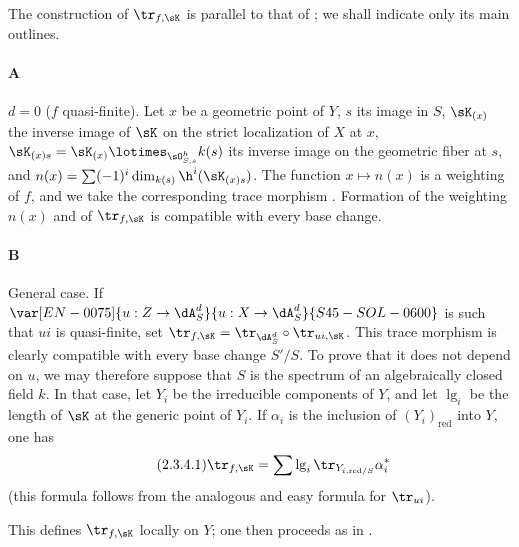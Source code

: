 \subsubsection{}\label{IV:2-3-4}

The construction of $\tr_{f,\sK}$ is parallel to that of
; we shall indicate only its main outlines.

\paragraph{A}
$d=0$ ($f$ quasi-finite). Let $x$ be a geometric point of $Y$, $s$ its image
in $S$, $\sK_{(x)}$ the inverse image of $\sK$ on the strict localization of
$X$ at $x$, $\sK_{(x)s} = \sK_{(x)}\lotimes_{\sO_{S,s}^h} k(s)$ its inverse
image on the geometric fiber at $s$, and
$n(x)=\sum (-1)^i \dim_{k(s)} \h^i(\sK_{(x)s})$. The function
$x\mapsto n(x)$ is a weighting of $f$, and we take the corresponding trace
morphism . Formation of the weighting $n(x)$ and of
$\tr_{f,\sK}$ is compatible with every base change.

\paragraph{B}
General case. If $\var[EN-0075]{u:Z\to \dA_S^d}{u:X\to \dA_S^d}{S45-SOL-0600}$ is such that $u i$ is quasi-finite, set
$\tr_{f,\sK} = \tr_{\dA_S^d}\circ \tr_{u i,\sK}$. This trace morphism is
clearly compatible with every base change $S'/S$. To prove that it does not
depend on $u$, we may therefore suppose that $S$ is the spectrum of an
algebraically closed field $k$. In that case, let $Y_i$ be the irreducible
components of $Y$, and let $\operatorname{lg}_i$ be the length of $\sK$ at
the generic point of $Y_i$. If $\alpha_i$ is the inclusion of
$(Y_i)_\text{red}$ into $Y$, one has
\begin{equation*}\tag{2.3.4.1}\label{IV:eq:2-3-4}
  \tr_{f,\sK} = \sum \operatorname{lg}_i \tr_{Y_{i,\text{red}/S}} \alpha_i^\ast
\end{equation*}
(this formula follows from the analogous and easy formula for $\tr_{u i}$).

This defines $\tr_{f,\sK}$ locally on $Y$; one then proceeds as in
.






